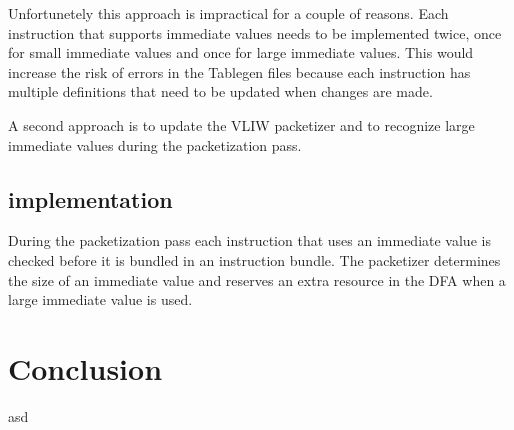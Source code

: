 Unfortunetely this approach is impractical for a couple of reasons. Each instruction that supports immediate values needs to be implemented twice, once for small immediate values and once for large immediate values. This would increase the risk of errors in the Tablegen files because each instruction has multiple definitions that need to be updated when changes are made.

A second approach is to update the VLIW packetizer and to recognize large immediate values during the packetization pass.


\subsection{implementation} %
\label{sub:implementation}
During the packetization pass each instruction that uses an immediate value is checked before it is bundled in an instruction bundle. The packetizer determines the size of an immediate value and reserves an extra resource in the DFA when a large immediate value is used.




\section{Conclusion}
asd
\acresetall

